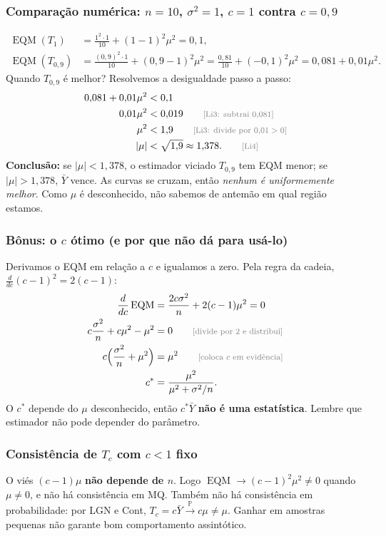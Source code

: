 \documentclass[11pt,a4paper]{article}
\theoremstyle{definition}
\theoremstyle{plain}
\newcommand{\EQM}{\operatorname{EQM}}
\newcommand{\Prob}{\mathbb{P}}
\newcommand{\convP}{\xrightarrow{\;\Prob\;}}
\newcommand{\bY}{\bar{Y}}
\newcommand{\just}[1]{\tag*{\footnotesize\textcolor{gray}{[#1]}}}
\begin{document}
\subsubsection*{Comparação numérica: $n=10$, $\sigma^2=1$, $c=1$ contra $c=0{,}9$}
\begin{align*}
\EQM(T_1)&=\frac{1^2\cdot1}{10}+(1-1)^2\mu^2=0{,}1,\\
\EQM(T_{0,9})&=\frac{(0{,}9)^2\cdot1}{10}+(0{,}9-1)^2\mu^2=\frac{0{,}81}{10}+(-0{,}1)^2\mu^2=0{,}081+0{,}01\mu^2 .
\end{align*}
Quando $T_{0,9}$ é melhor? Resolvemos a desigualdade passo a passo:
\begin{align*}
0{,}081+0{,}01\mu^2&<0{,}1\\
0{,}01\mu^2&<0{,}019 \just{Li3: subtrai $0{,}081$}\\
\mu^2&<1{,}9 \just{Li3: divide por $0{,}01>0$}\\
|\mu|&<\sqrt{1{,}9}\approx1{,}378 . \just{Li4}
\end{align*}
\textbf{Conclusão:} se $|\mu|<1{,}378$, o estimador viciado $T_{0,9}$ tem EQM menor; se $|\mu|>1{,}378$, $\bY$ vence. As curvas se cruzam, então \emph{nenhum é uniformemente melhor}. Como $\mu$ é desconhecido, não sabemos de antemão em qual região estamos.

\subsubsection*{Bônus: o $c$ ótimo (e por que não dá para usá-lo)}
Derivamos o EQM em relação a $c$ e igualamos a zero. Pela regra da cadeia, $\frac{d}{dc}(c-1)^2=2(c-1)$:
\begin{align*}
\frac{d}{dc}\EQM&=\frac{2c\sigma^2}{n}+2(c-1)\mu^2=0\\
c\frac{\sigma^2}{n}+c\mu^2-\mu^2&=0 \just{divide por 2 e distribui}\\
c\Big(\frac{\sigma^2}{n}+\mu^2\Big)&=\mu^2 \just{coloca $c$ em evidência}\\
c^*&=\frac{\mu^2}{\mu^2+\sigma^2/n}.
\end{align*}
O $c^*$ depende do $\mu$ desconhecido, então $c^*\bY$ \textbf{não é uma estatística}. Lembre que estimador não pode depender do parâmetro.

\subsubsection*{Consistência de $T_c$ com $c<1$ fixo}
O viés $(c-1)\mu$ \textbf{não depende de $n$}. Logo $\EQM\to(c-1)^2\mu^2\neq0$ quando $\mu\ne0$, e não há consistência em MQ. Também não há consistência em probabilidade: por LGN e Cont, $T_c=c\bY\convP c\mu\neq\mu$. Ganhar em amostras pequenas não garante bom comportamento assintótico.
\end{document}
